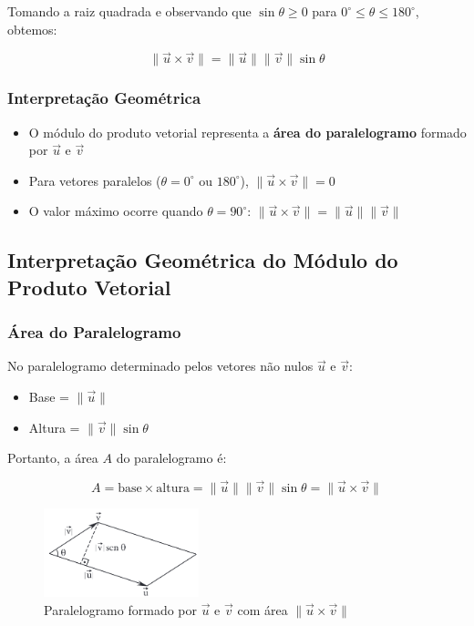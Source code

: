 Tomando a raiz quadrada e observando que $\sin\theta \geq 0$ para $0^\circ \leq
\theta \leq 180^\circ$, obtemos:

\[
  \|\vec{u} \times \vec{v}\| = \|\vec{u}\|\|\vec{v}\|\sin\theta
\]

\subsubsection*{Interpretação Geométrica}
\begin{itemize}
  \item O módulo do produto vetorial representa a \textbf{área do paralelogramo}
    formado por $\vec{u}$ e $\vec{v}$
  \item Para vetores paralelos ($\theta = 0^\circ$ ou $180^\circ$), $\|\vec{u}
    \times \vec{v}\| = 0$
  \item O valor máximo ocorre quando $\theta = 90^\circ$: $\|\vec{u} \times
    \vec{v}\| = \|\vec{u}\|\|\vec{v}\|$
\end{itemize}

\subsection{Interpretação Geométrica do Módulo do Produto Vetorial}

\subsubsection*{Área do Paralelogramo}
No paralelogramo determinado pelos vetores não nulos $\vec{u}$ e $\vec{v}$:

\begin{itemize}
  \item Base = $\|\vec{u}\|$
  \item Altura = $\|\vec{v}\|\sin\theta$
\end{itemize}

Portanto, a área $A$ do paralelogramo é:

\begin{equation}
  A = \text{base} \times \text{altura} = \|\vec{u}\|\|\vec{v}\|\sin\theta = \|\vec{u} \times \vec{v}\|
  \label{eq:area_paralelogramo}
\end{equation}

\begin{figure}[h]
  \centering
  \includegraphics[width=0.4\textwidth]{./fig/fig3.5.png}
  \caption{Paralelogramo formado por $\vec{u}$ e $\vec{v}$ com área $\|\vec{u} \times \vec{v}\|$}
  \label{fig:fig3.5}
\end{figure}

